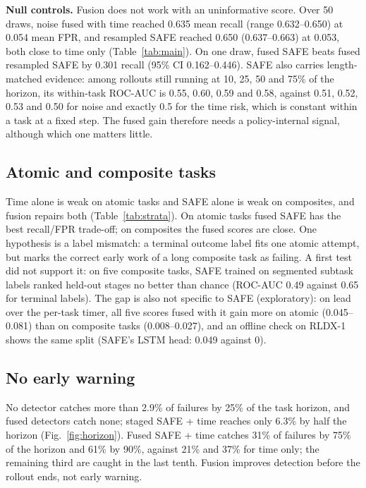 \documentclass[conference,a4paper]{IEEEtran}
\begin{document}
\textbf{Null controls.} Fusion does not work with an uninformative score. Over 50 draws,
noise fused with time reached 0.635 mean recall (range 0.632--0.650) at 0.054 mean FPR,
and resampled SAFE reached 0.650 (0.637--0.663) at 0.053, both close to time only
(Table~\ref{tab:main}). On one draw, fused SAFE beats fused resampled SAFE by 0.301 recall
(95\% CI 0.162--0.446). SAFE also carries length-matched evidence: among rollouts still
running at 10, 25, 50 and 75\% of the horizon, its within-task ROC-AUC is 0.55, 0.60, 0.59
and 0.58, against 0.51, 0.52, 0.53 and 0.50 for noise and exactly 0.5 for the time risk,
which is constant within a task at a fixed step. The fused gain therefore needs a
policy-internal signal, although which one matters little.

\subsection{Atomic and composite tasks}



Time alone is weak on atomic tasks and SAFE alone is weak on composites, and fusion repairs
both (Table~\ref{tab:strata}). On atomic tasks fused SAFE has the best recall/FPR trade-off;
on composites the fused scores are close. One hypothesis is a label mismatch: a terminal
outcome label fits one atomic attempt, but marks the correct early work of a long composite
task as failing. A first test did not support it: on five composite tasks, SAFE trained on
segmented subtask labels ranked held-out stages no better than chance (ROC-AUC 0.49 against
0.65 for terminal labels). The gap is also not specific to SAFE (exploratory): on lead over
the per-task timer, all five scores fused with it gain more on atomic (0.045--0.081) than on
composite tasks (0.008--0.027), and an offline check on RLDX-1 shows the same split (SAFE's
LSTM head: 0.049 against 0).

\subsection{No early warning}

No detector catches more than 2.9\% of failures by 25\% of the task horizon, and fused
detectors catch none; staged SAFE + time reaches only 6.3\% by half the horizon
(Fig.~\ref{fig:horizon}). Fused SAFE + time catches 31\% of failures by 75\% of the
horizon and 61\% by 90\%, against 21\% and 37\% for time only; the remaining third are
caught in the last tenth. Fusion improves detection before the rollout ends, not early
warning.
\end{document}
